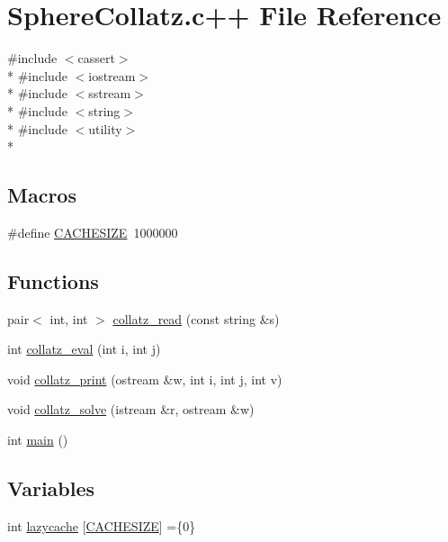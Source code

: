 \hypertarget{SphereCollatz_8c_09_09}{\section{Sphere\-Collatz.\-c++ File Reference}
\label{SphereCollatz_8c_09_09}
}
{\ttfamily \#include $<$cassert$>$}\\*
{\ttfamily \#include $<$iostream$>$}\\*
{\ttfamily \#include $<$sstream$>$}\\*
{\ttfamily \#include $<$string$>$}\\*
{\ttfamily \#include $<$utility$>$}\\*
\subsection*{Macros}
\begin{DoxyCompactItemize}
\item 
\#define \hyperlink{SphereCollatz_8c_09_09_ac6cac52a3e9d61f741714f164dc59c41}{C\-A\-C\-H\-E\-S\-I\-Z\-E}~1000000
\end{DoxyCompactItemize}
\subsection*{Functions}
\begin{DoxyCompactItemize}
\item 
pair$<$ int, int $>$ \hyperlink{SphereCollatz_8c_09_09_a2772f8a734aeab48332eb3b282f991ba}{collatz\-\_\-read} (const string \&s)
\item 
int \hyperlink{SphereCollatz_8c_09_09_a0b0d3827a619c18aa4d96b8ee8b1c47d}{collatz\-\_\-eval} (int i, int j)
\item 
void \hyperlink{SphereCollatz_8c_09_09_aeda0b7ea3e40e1e7487ccc436f33a559}{collatz\-\_\-print} (ostream \&w, int i, int j, int v)
\item 
void \hyperlink{SphereCollatz_8c_09_09_a0ac646d2122741f9a9a52201bf9551cc}{collatz\-\_\-solve} (istream \&r, ostream \&w)
\item 
int \hyperlink{SphereCollatz_8c_09_09_ae66f6b31b5ad750f1fe042a706a4e3d4}{main} ()
\end{DoxyCompactItemize}
\subsection*{Variables}
\begin{DoxyCompactItemize}
\item 
int \hyperlink{SphereCollatz_8c_09_09_ab4e9dc0770a2bfa353b075d41c82f2a6}{lazycache} \mbox{[}\hyperlink{SphereCollatz_8c_09_09_ac6cac52a3e9d61f741714f164dc59c41}{C\-A\-C\-H\-E\-S\-I\-Z\-E}\mbox{]} =\{0\}
\end{DoxyCompactItemize}


